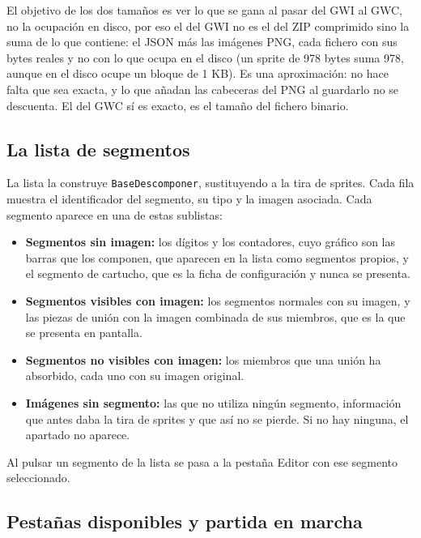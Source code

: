 El objetivo de los dos tamaños es ver lo que se gana al pasar del GWI
al GWC, no la ocupación en disco, por eso el del GWI no es el del ZIP
comprimido sino la suma de lo que contiene: el JSON más las imágenes
PNG, cada fichero con sus bytes reales y no con lo que ocupa en el
disco (un sprite de 978 bytes suma 978, aunque en el disco ocupe un
bloque de 1 KB). Es una aproximación: no hace falta que sea exacta, y
lo que añadan las cabeceras del PNG al guardarlo no se descuenta. El
del GWC sí es exacto, es el tamaño del fichero binario.

\subsection{La lista de segmentos}
\label{sec:F5I7Lista}

La lista la construye \texttt{BaseDescomponer}, sustituyendo a la tira
de sprites. Cada fila muestra el identificador del segmento, su tipo y
la imagen asociada. Cada segmento aparece en una de estas sublistas:

\begin{itemize}
	\item \textbf{Segmentos sin imagen:} los dígitos y los contadores,
	cuyo gráfico son las barras que los componen, que aparecen en la
	lista como segmentos propios, y el segmento de cartucho, que es la
	ficha de configuración y nunca se presenta.

	\item \textbf{Segmentos visibles con imagen:} los segmentos normales
	con su imagen, y las piezas de unión con la imagen combinada de sus
	miembros, que es la que se presenta en pantalla.

	\item \textbf{Segmentos no visibles con imagen:} los miembros que
	una unión ha absorbido, cada uno con su imagen original.

	\item \textbf{Imágenes sin segmento:} las que no utiliza ningún
	segmento, información que antes daba la tira de sprites y que así
	no se pierde. Si no hay ninguna, el apartado no aparece.
\end{itemize}

Al pulsar un segmento de la lista se pasa a la pestaña Editor con ese segmento seleccionado.

\subsection{Pestañas disponibles y partida en marcha}
\label{sec:F5I7Estados}

